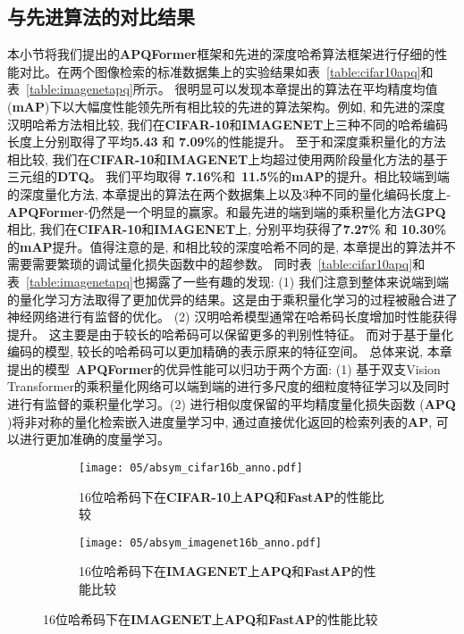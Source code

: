 \subsection{与先进算法的对比结果}
本小节将我们提出的\textbf{APQFormer}框架和先进的深度哈希算法框架进行仔细的性能对比。在两个图像检索的标准数据集上的实验结果如表~\ref{table:cifar10apq}和表~\ref{table:imagenetapq}所示。 很明显可以发现本章提出的算法在平均精度均值(\textbf{mAP})下以大幅度性能领先所有相比较的先进的算法架构。例如, 和先进的深度汉明哈希方法相比较, 我们在\textbf{CIFAR-10}和\textbf{IMAGENET}上三种不同的哈希编码长度上分别取得了平均\textbf{5.43} 和 \textbf{7.09\%}的性能提升。 至于和深度乘积量化的方法相比较, 我们在\textbf{CIFAR-10}和\textbf{IMAGENET}上均超过使用两阶段量化方法的基于三元组的\textbf{DTQ}。 我们平均取得  \textbf{7.16\%}和~\textbf{11.5\%}的\textbf{mAP}的提升。相比较端到端的深度量化方法, 本章提出的算法在两个数据集上以及3种不同的量化编码长度上-\textbf{APQFormer}-仍然是一个明显的赢家。和最先进的端到端的乘积量化方法\textbf{GPQ}相比, 我们在\textbf{CIFAR-10}和\textbf{IMAGENET}上, 分别平均获得了\textbf{7.27\%} 和 \textbf{10.30\%} 的\textbf{mAP}提升。值得注意的是, 和相比较的深度哈希不同的是, 本章提出的算法并不需要需要繁琐的调试量化损失函数中的超参数。 同时表~\ref{table:cifar10apq}和表~\ref{table:imagenetapq}也揭露了一些有趣的发现: (1) 我们注意到整体来说端到端的量化学习方法取得了更加优异的结果。这是由于乘积量化学习的过程被融合进了神经网络进行有监督的优化。 (2) 汉明哈希模型通常在哈希码长度增加时性能获得提升。 这主要是由于较长的哈希码可以保留更多的判别性特征。 而对于基于量化编码的模型, 较长的哈希码可以更加精确的表示原来的特征空间。 总体来说, 本章提出的模型~\textbf{APQFormer}的优异性能可以归功于两个方面: (1) 基于双支Vision Transformer的乘积量化网络可以端到端的进行多尺度的细粒度特征学习以及同时进行有监督的乘积量化学习。(2) 进行相似度保留的平均精度量化损失函数 (\textbf{APQ} )将非对称的量化检索嵌入进度量学习中, 通过直接优化返回的检索列表的\textbf{AP}, 可以进行更加准确的度量学习。
\begin{figure}[!htp]
    \centering
    \begin{subfigure}{\textwidth}
      \centering
      \texttt{[image: 05/absym\_cifar16b\_anno.pdf]}
      \caption{16位哈希码下在\textbf{CIFAR-10}上\textbf{APQ}和\textbf{FastAP}的性能比较}
    \end{subfigure}
    \hspace{1cm}
    \begin{subfigure}{\textwidth}
      \centering
      \texttt{[image: 05/absym\_imagenet16b\_anno.pdf]}
      \caption{16位哈希码下在\textbf{IMAGENET}上\textbf{APQ}和\textbf{FastAP}的性能比较}
    \end{subfigure}
    \label{fig:abapfast}
  \end{figure}

